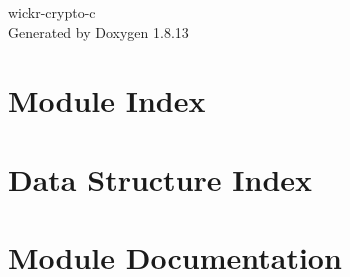 \documentclass[twoside]{book}
\newcommand{\+}{\discretionary{\mbox{\scriptsize$\hookleftarrow$}}{}{}}
\newcommand{\clearemptydoublepage}{%
  \newpage{\pagestyle{empty}\cleardoublepage}%
}
\begin{document}
\hypersetup{pageanchor=false,
             bookmarksnumbered=true,
             pdfencoding=unicode
            }
\begin{titlepage}
\vspace*{7cm}
\begin{center}%
{\Large wickr-\/crypto-\/c }\\
\vspace*{1cm}
{\large Generated by Doxygen 1.8.13}\\
\end{center}
\end{titlepage}
\clearemptydoublepage
{}
\tableofcontents
\clearemptydoublepage
{}
\hypersetup{pageanchor=true}

\chapter{Module Index}

\chapter{Data Structure Index}

\chapter{Module Documentation}
























\end{document}
